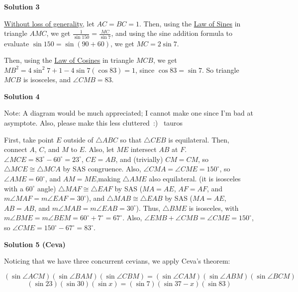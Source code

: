 \begin{enumerate}
 



\textbf{Solution 3}

\href{https://artofproblemsolving.com/wiki/index.php?title=Without\_loss\_of\_generality}{Without loss of generality}, let $AC = BC = 1$.  Then, using the \href{https://artofproblemsolving.com/wiki/index.php?title=Law\_of\_Sines}{Law of Sines} in triangle $AMC$, we get $\frac {1}{\sin 150} = \frac {MC}{\sin 7}$, and using the sine addition formula to evaluate $\sin 150 = \sin (90 + 60)$, we get $MC = 2 \sin 7$.  

 Then, using the \href{https://artofproblemsolving.com/wiki/index.php?title=Law\_of\_Cosines}{Law of Cosines} in triangle $MCB$, we get $MB^2 = 4\sin^2 7 + 1 - 4\sin 7(\cos 83) = 1$, since $\cos 83 = \sin 7$. So triangle $MCB$ is isosceles, and $\angle CMB = \boxed{83}$.

 



\textbf{Solution 4}

Note: A diagram would be much appreciated; I cannot make one since I'm bad at asymptote. Also, please make this less cluttered :) ~tauros

 First, take point $E$ outside of $\triangle{ABC}$ so that $\triangle{CEB}$ is equilateral. Then, connect $A$, $C$, and $M$ to $E$. Also, let $ME$ intersect $AB$ at $F$. $\angle{MCE} = 83^\circ - 60^\circ = 23^\circ$, $CE = AB$, and (trivially) $CM = CM$, so $\triangle{MCE} \cong  \triangle{MCA}$ by SAS congruence. Also, $\angle{CMA} = \angle{CME} = 150^\circ$, so $\angle{AME} = 60^\circ$, and $AM = ME$,making $\triangle{AME}$ also equilateral. (it is isosceles with a $60^\circ$ angle) $\triangle{MAF} \cong \triangle{EAF}$ by SAS ($MA = AE$, $AF = AF$, and $m\angle{MAF} = m\angle{EAF} = 30^\circ$), and $\triangle{MAB} \cong \triangle{EAB}$ by SAS ($MA = AE$, $AB = AB$, and $m\angle{MAB} = m\angle{EAB} = 30^\circ$). Thus, $\triangle{BME}$ is isosceles, with $m\angle{BME} = m\angle{BEM} = 60^\circ + 7^\circ = 67^\circ$. Also, $\angle{EMB} + \angle {CMB} = \angle{CME} = 150^\circ$, so $\angle{CME} = 150^\circ - 67^\circ  = \boxed{83^\circ}$.

 



\textbf{Solution 5 (Ceva)}

Noticing that we have three concurrent cevians, we apply Ceva's theorem:

 
 \[(\sin \angle ACM)(\sin \angle BAM)(\sin \angle CBM) = (\sin \angle CAM)(\sin \angle ABM)(\sin \angle BCM)\]
 \[(\sin 23)(\sin 30)(\sin x) = (\sin 7)(\sin 37-x)(\sin 83)\]


\end{enumerate}

